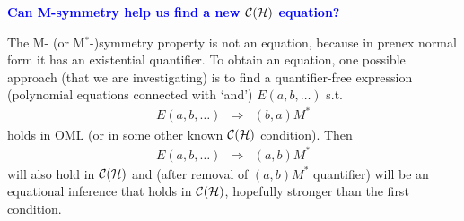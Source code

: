 \documentclass{slides}
\begin{document}
\begin{slide}

\begin{center}
\textcolor{blue}{\textbf{Can M-symmetry help us find a
new ${\cal C}({\cal H})$ equation?}}
\end{center}

The M- (or M${}^*$-)symmetry property is not an equation, because
in prenex normal form it has
an existential quantifier.  To obtain an equation, one possible approach
(that we are investigating)
is to find a quantifier-free expression (polynomial equations
connected with `and') $E(a,b,\ldots )$ s.t.
\begin{eqnarray}
E(a,b,\ldots )  & \Rightarrow & (b,a)M^* \label{mshyp}
\end{eqnarray}
holds in OML (or in some other known ${\cal C}({\cal H})$ condition).  Then
\begin{eqnarray}
E(a,b,\ldots )  & \Rightarrow & (a,b)M^* \label{msconcl}
\end{eqnarray}
will also hold in ${\cal C}({\cal H})$ and (after removal of $(a,b)M^*$
quantifier) will
be an equational inference that holds in ${\cal C}({\cal H})$, hopefully
stronger than the first condition.

\end{slide}
\end{document}
